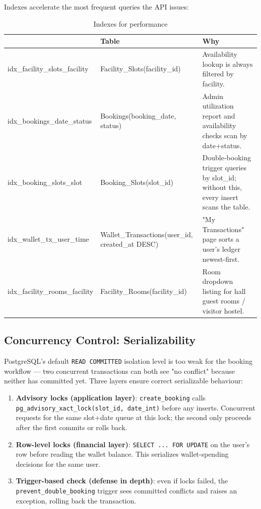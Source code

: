 \documentclass[11pt,a4paper]{article}
\begin{document}
Indexes accelerate the most frequent queries the API issues:

\begin{table}[H]
\centering
\small
\setlength{\tabcolsep}{4pt}
\renewcommand{\arraystretch}{1.3}
\begin{tabularx}{\textwidth}{@{}>{\scriptsize\ttfamily\raggedright\arraybackslash}p{4.4cm}>{\scriptsize\ttfamily\raggedright\arraybackslash}p{5.4cm}>{\small\raggedright\arraybackslash}X@{}}
\toprule
{\normalfont\textbf{Index}} & {\normalfont\textbf{Table}} & {\normalfont\textbf{Why}} \\
\midrule
idx\_facility\_slots\_facility & Facility\_Slots(facility\_id) & Availability lookup is always filtered by facility. \\
idx\_bookings\_date\_status & Bookings(booking\_date, status) & Admin utilization report and availability checks scan by date+status. \\
idx\_booking\_slots\_slot & Booking\_Slots(slot\_id) & Double-booking trigger queries by slot\_id; without this, every insert scans the table. \\
idx\_wallet\_tx\_user\_time & Wallet\_Transactions(user\_id, created\_at DESC) & "My Transactions" page sorts a user's ledger newest-first. \\
idx\_facility\_rooms\_facility & Facility\_Rooms(facility\_id) & Room dropdown listing for hall guest rooms / visitor hostel. \\
\bottomrule
\end{tabularx}
\renewcommand{\arraystretch}{1}
\caption{Indexes for performance}
\end{table}

\subsection{Concurrency Control: Serializability}

PostgreSQL's default \texttt{READ COMMITTED} isolation level is too weak for the booking workflow --- two concurrent transactions can both see "no conflict" because neither has committed yet. Three layers ensure correct serializable behaviour:

\begin{enumerate}[leftmargin=*]
    \item \textbf{Advisory locks (application layer)}: \texttt{create\_booking} calls \texttt{pg\_advisory\_xact\_lock(slot\_id, date\_int)} before any inserts. Concurrent requests for the same slot+date queue at this lock; the second only proceeds after the first commits or rolls back.
    \item \textbf{Row-level locks (financial layer)}: \texttt{SELECT ... FOR UPDATE} on the user's row before reading the wallet balance. This serializes wallet-spending decisions for the same user.
    \item \textbf{Trigger-based check (defense in depth)}: even if locks failed, the \texttt{prevent\_double\_booking} trigger sees committed conflicts and raises an exception, rolling back the transaction.
\end{enumerate}
\end{document}
